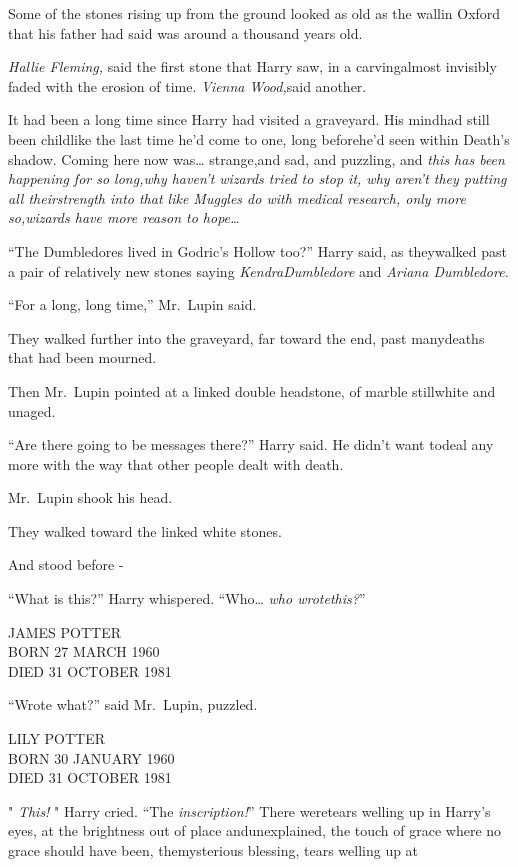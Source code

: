 Some of the stones rising up from the ground looked as old as the wallin Oxford that his father had said was around a thousand years old.

\emph{Hallie Fleming,} said the first stone that Harry saw, in a carvingalmost invisibly faded with the erosion of time. \emph{Vienna Wood,}said another.

It had been a long time since Harry had visited a graveyard. His mindhad still been childlike the last time he'd come to one, long beforehe'd seen within Death's shadow. Coming here now was\ldots{} strange,and sad, and puzzling, and \emph{this has been happening for so long,why haven't wizards tried to stop it, why aren't they putting all theirstrength into that like Muggles do with medical research, only more so,wizards have more reason to hope\ldots{}}

``The Dumbledores lived in Godric's Hollow too?'' Harry said, as theywalked past a pair of relatively new stones saying \emph{KendraDumbledore} and \emph{Ariana Dumbledore.}

``For a long, long time,'' Mr.~Lupin said.

They walked further into the graveyard, far toward the end, past manydeaths that had been mourned.

Then Mr.~Lupin pointed at a linked double headstone, of marble stillwhite and unaged.

``Are there going to be messages there?'' Harry said. He didn't want todeal any more with the way that other people dealt with death.

Mr.~Lupin shook his head.

They walked toward the linked white stones.

And stood before -

``What is this?'' Harry whispered. ``Who\ldots{} \emph{who wrotethis?}''

JAMES POTTER\\ BORN 27 MARCH 1960\\ DIED 31 OCTOBER 1981

``Wrote what?'' said Mr.~Lupin, puzzled.

LILY POTTER\\ BORN 30 JANUARY 1960\\ DIED 31 OCTOBER 1981

" \emph{This!} " Harry cried. ``The \emph{inscription!}'' There weretears welling up in Harry's eyes, at the brightness out of place andunexplained, the touch of grace where no grace should have been, themysterious blessing, tears welling up at

